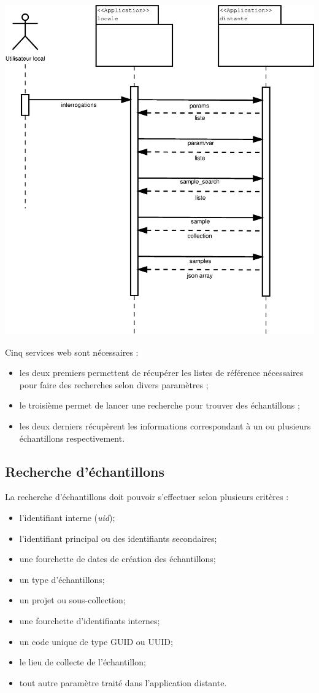 \includegraphics[width=\linewidth]{images/sequence}

Cinq services web sont nécessaires :
\begin{itemize}
\item les deux premiers permettent de récupérer les listes de référence nécessaires pour faire des recherches selon divers paramètres ;
\item le troisième permet de lancer une recherche pour trouver des échantillons ;
\item les deux derniers récupèrent les informations correspondant à un ou plusieurs échantillons respectivement.
\end{itemize}


\subsection{Recherche d'échantillons}
La recherche d'échantillons doit pouvoir s'effectuer selon plusieurs critères :
\begin{itemize}
\item l'identifiant interne (\textit{uid});
\item l'identifiant principal ou des identifiants secondaires;
\item une fourchette de dates de création des échantillons;
\item un type d'échantillons;
\item un projet ou sous-collection;
\item une fourchette d'identifiants internes;
\item un code unique de type GUID ou UUID;
\item le lieu de collecte de l'échantillon;
\item tout autre paramètre traité dans l'application distante.
\end{itemize}

